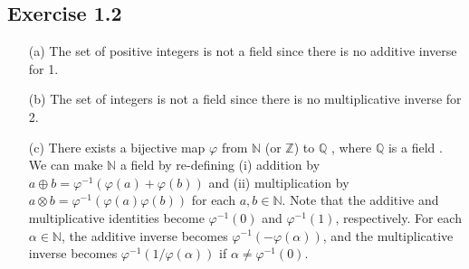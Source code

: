\documentclass{article}
\begin{document}
\subsection{Exercise 1.2}
\begin{itemize}
  \item[(a)] The set of positive integers is not a field since there is no additive inverse for 1.
  \item[(b)] The set of integers is not a field since there is no multiplicative inverse for 2.
  \item[(c)] There exists a bijective map $\varphi$ from $\mathbb{N}$ (or $\mathbb{Z}$) to $\mathbb{Q}$ \cite{Q_countable}, where $\mathbb{Q}$ is a field \cite{Q_field}.
  	We can make $\mathbb{N}$ a field by re-defining (i) addition by $a \oplus b = \varphi^{-1} (\varphi(a) + \varphi(b))$ and (ii) multiplication by $a \otimes b = \varphi^{-1}(\varphi(a)\varphi(b))$ for each $a, b \in \mathbb{N}$.
	Note that the additive and multiplicative identities become $\varphi^{-1}(0)$ and $\varphi^{-1}(1)$, respectively.
	For each $\alpha\in\mathbb{N}$, the additive inverse becomes $\varphi^{-1}(-\varphi(\alpha))$, and the multiplicative inverse becomes $\varphi^{-1}(1/\varphi(\alpha))$ if $\alpha\ne\varphi^{-1}(0)$.
	

\end{itemize}
\end{document}
